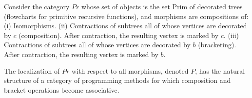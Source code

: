 Consider the category $Pr$ whose set of objects is the set $\text{Prim}$ of decorated trees (flowcharts for primitive recursive functions), and morphisms are compositions of:
(i) Isomorphisms.
(ii) Contractions of subtrees all of whose vertices are decorated by $c$ (composition). After contraction, the resulting vertex is marked by $c$.
(iii) Contractions of subtrees all of whose vertices are decorated by $b$ (bracketing). After contraction, the resulting vertex is marked by $b$.

The localization of $Pr$ with respect to all morphisms, denoted $P$, has the natural structure of a category of programming methods for which composition and bracket operations become associative.
